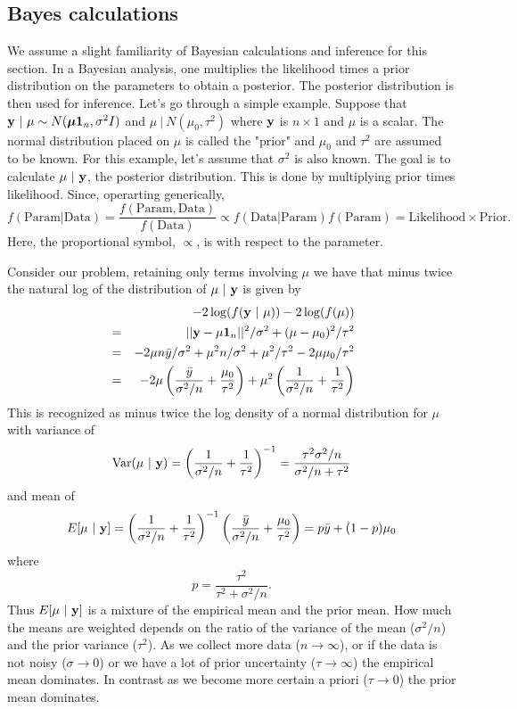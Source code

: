 \subsection{Bayes calculations}
We assume a slight familiarity of Bayesian calculations and inference for this section.
In a Bayesian analysis, one multiplies the likelihood times a prior distribution
on the parameters to obtain a posterior. The posterior distribution is then used for
inference. Let's go through a simple example.
Suppose that $\mathbf{y} ~|~ \mu \sim N(\boldsymbol{\mu} \mathbf{1}_n, \sigma^2 I)$ and
$\mu ~|~ N(\mu_0, \tau^2)$ where $\mathbf{y}$ is $n \times 1$ and $\mu$ is a scalar. The
normal distribution placed on $\mu$ is called the "prior" and $\mu_0$ and $\tau^2$ 
are assumed to be known. For this example, let's assume that $\sigma^2$ is also
known. The goal is to calculate
$\mu ~|~ \mathbf{y}$, the posterior distribution. This is done by multiplying prior times
likelihood. Since, operarting generically,
$$
f(\mbox{Param} | \mbox{Data}) = \frac{f(\mbox{Param}, \mbox{Data})}{f(\mbox{Data})} 
\propto f(\mbox{Data} | \mbox{Param}) f(\mbox{Param}) = \mbox{Likelihood} \times \mbox{Prior}.
$$
Here, the proportional symbol, $\propto$, is with respect to the parameter.

Consider our problem, retaining only terms involving $\mu$ we have that minus twice the natural log of the
distribution of  $\mu ~|~ \mathbf{y}$ is given by
\begin{eqnarray*}
&   & -2 \log(f(\mathbf{y} ~|~ \mu)) - 2 \log(f(\mu)) \\
& = & ||\mathbf{y} - \mu \mathbf{1}_n||^2 / \sigma^2  + (\mu - \mu_0)^2 / \tau^2 \\
& = & -2 \mu n \bar y / \sigma^2 + \mu^2 n / \sigma^2 + \mu^2 / \tau^2 - 2 \mu \mu_0 / \tau^2 \\
& = & -2 \mu \left(
\frac{\bar y}{\sigma^2 / n} + \frac{\mu_0}{\tau^2}\right)
+ \mu^2 \left(
\frac{1}{\sigma^2 / n} + \frac{1}{\tau^2}
\right)
\end{eqnarray*}
This is recognized as minus twice the log density of a normal distribution for $\mu$ with variance
of 
$$
\mbox{Var}(\mu ~|~ \mathbf{y}) =
\left(
\frac{1}{\sigma^2 / n} + \frac{1}{\tau^2}
\right)^{-1}
=\frac{\tau^2 \sigma^2 / n}{\sigma^2 / n + \tau^2}
$$
and mean of
$$
E[\mu ~|~ \mathbf{y}] = \left(
\frac{1}{\sigma^2 / n} + \frac{1}{\tau^2}
\right)^{-1}
\left(
\frac{\bar y}{\sigma^2 / n} + \frac{\mu_0}{\tau^2}\right)
= p \bar y + (1 - p) \mu_0
$$
where 
$$
p = \frac{\tau^2}{\tau^2 + \sigma^2 /n }.
$$
Thus $E[\mu ~|~ \mathbf{y}]$ is a mixture of the empirical mean and the prior mean. How much 
the means are weighted depends on the ratio of the variance of the mean ($\sigma^2/n$)
and the prior variance ($\tau^2$). As we collect more data ($n \rightarrow \infty$), or if the
data is not noisy
($\sigma \rightarrow 0$) or we have a lot of prior uncertainty ($\tau \rightarrow \infty$) the empirical mean dominates. In contrast as we become more certain a priori
($\tau \rightarrow 0$) the prior mean dominates.


